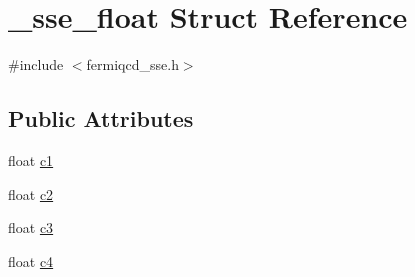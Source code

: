 \hypertarget{struct__sse__float}{
\section{\_\-sse\_\-float Struct Reference}
\label{struct__sse__float}
}


{\ttfamily \#include $<$fermiqcd\_\-sse.h$>$}\subsection*{Public Attributes}
\begin{DoxyCompactItemize}
\item 
float \hyperlink{struct__sse__float_a32051c01c5b26be1e6a12d4d2fee579f}{c1}
\item 
float \hyperlink{struct__sse__float_a3a7034f3f255a7be18aa97f70449dcce}{c2}
\item 
float \hyperlink{struct__sse__float_a0ab5699672836110060c9128cab16f89}{c3}
\item 
float \hyperlink{struct__sse__float_ada575beb64ed670b52342b02a2978bc4}{c4}
\end{DoxyCompactItemize}


